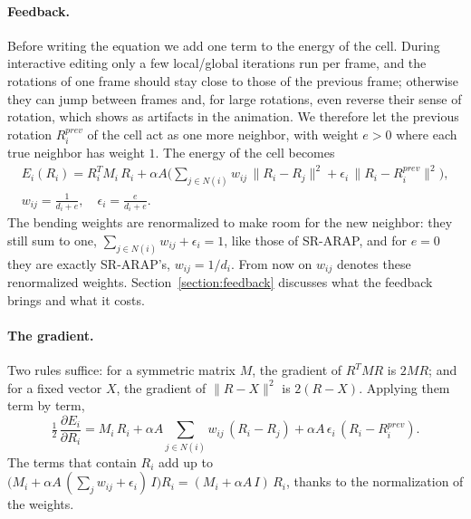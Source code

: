 \documentclass{birkjour}
\theoremstyle{remark}
\numberwithin{equation}{section}
\begin{document}
\paragraph{Feedback.} Before writing the equation we add one term to the energy of the cell. During interactive editing only a few local/global iterations run per frame, and the rotations of one frame should stay close to those of the previous frame; otherwise they can jump between frames and, for large rotations, even reverse their sense of rotation, which shows as artifacts in the animation. We therefore let the previous rotation $R^{prev}_i$ of the cell act as one more neighbor, with weight $e > 0$ where each true neighbor has weight $1$. The energy of the cell becomes
\begin{equation}
\label{eq:cell_energy}
\begin{gathered}
E_i(R_i) = R_i^T M_i \, R_i + \alpha A \Big( \sum_{j \in N(i)} w_{ij} \, \| R_i - R_j \|^2 + \epsilon_i \, \| R_i - R^{prev}_i \|^2 \Big),
\\
w_{ij} = \frac{1}{d_i + e}, \quad \epsilon_i = \frac{e}{d_i + e}.
\end{gathered}
\end{equation}
The bending weights are renormalized to make room for the new neighbor: they still sum to one, $\sum_{j \in N(i)} w_{ij} + \epsilon_i = 1$, like those of SR-ARAP, and for $e = 0$ they are exactly SR-ARAP's, $w_{ij} = 1/d_i$. From now on $w_{ij}$ denotes these renormalized weights. Section~\ref{section:feedback} discusses what the feedback brings and what it costs.

\paragraph{The gradient.} Two rules suffice: for a symmetric matrix $M$, the gradient of $R^T M R$ is $2 M R$; and for a fixed vector $X$, the gradient of $\| R - X \|^2$ is $2 (R - X)$. Applying them term by term,
\begin{equation*}
\tfrac{1}{2} \, \frac{\partial E_i}{\partial R_i} = M_i \, R_i + \alpha A \sum_{j \in N(i)} w_{ij} \, (R_i - R_j) + \alpha A \, \epsilon_i \, (R_i - R^{prev}_i).
\end{equation*}
The terms that contain $R_i$ add up to $\big( M_i + \alpha A \, (\sum_j w_{ij} + \epsilon_i) \, I \big) R_i = (M_i + \alpha A \, I) \, R_i$, thanks to the normalization of the weights.
\end{document}
